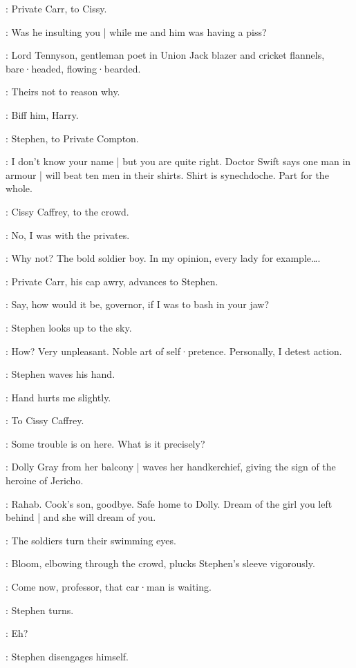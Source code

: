 :
Private Carr,
to Cissy.

\Carr:
Was he insulting you |
while me and him was having a piss?

:
Lord Tennyson,
gentleman poet in Union Jack blazer and cricket flannels,
bare·headed,
flowing·bearded.

\LordTennyson:
Theirs not to reason why.

\Compton:
Biff him,
Harry.

:
Stephen,
to Private Compton.

\Stephen:
I don't know your name |
but you are quite right.
Doctor Swift says one man in armour |
will beat ten men in their shirts.
Shirt is synechdoche.
Part for the whole.

:
Cissy Caffrey,
to the crowd.

\Cissy:
No,
I was with the privates.

\Stephen:
Why not?
The bold soldier boy.
In my opinion,
every lady for example….

:
Private Carr,
his cap awry,
advances to Stephen.

\Carr:
Say,
how would it be,
governor,
if I was to bash in your jaw?

:
Stephen looks up to the sky.

\Stephen:
How?
Very unpleasant.
Noble art of self·pretence.
Personally,
I detest action.

:
Stephen waves his hand.

\Stephen:
Hand hurts me slightly.

:
To Cissy Caffrey.

\Stephen:
Some trouble is on here.
What is it precisely?

:
Dolly Gray from her balcony |
waves her handkerchief,
giving the sign of the heroine of Jericho.

\DollyGray:
Rahab.
Cook's son,
goodbye.
Safe home to Dolly.
Dream of the girl you left behind |
%
and she will dream of you.

:
The soldiers turn their swimming eyes.

:
Bloom,
elbowing through the crowd,
plucks Stephen's sleeve vigorously.

\Bloom:
Come now,
professor,
that car·man is waiting.

:
Stephen turns.

\Stephen:
Eh?

:
Stephen disengages himself.

